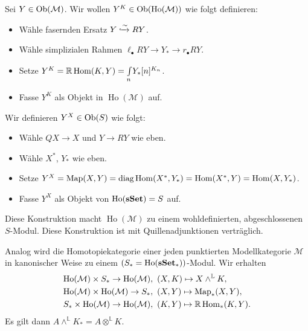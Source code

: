 \documentclass{cheat-sheet}
\newcommand{\ModC}{\mathcal{M}} %
\DeclareMathOperator{\Ho}{Ho} %
\newcommand{\LL}{\mathbb{L}} %
\newcommand{\RR}{\mathbb{R}} %
\newcommand{\RD}[1]{\mathbb{R} #1} %
\begin{document}
Sei $Y \in \Ob(\ModC)$.
Wir wollen $Y^K \in \Ob(\Ho(\ModC))$ wie folgt definieren:
\begin{itemize}
  \item Wähle fasernden Ersatz $Y \xhookrightarrow{{\sim}} RY$.
  \item Wähle simplizialen Rahmen $\ell_\bullet RY \to Y_* \to r_\bullet RY$.
  \item Setze $Y^K = \RD \Hom(K, Y) = \EndC{n} Y_*[n]^{K_n}$.
  \item Fasse $Y^K$ als Objekt in $\Ho(\ModC)$ auf.
\end{itemize}

Wir definieren $Y^X \in \operatorname{Ob}(S)$ wie folgt:
\begin{itemize}
  \item Wähle $QX \to X$ und $Y \to RY$ wie eben.
  \item Wähle $X^*$, $Y_*$ wie eben.
  \item Setze $Y^X = \text{Map}(X, Y) = \text{diag} \operatorname{Hom}(X^*, Y_*) = \operatorname{Hom}(X^*, Y) = \operatorname{Hom}(X, Y_*)$.
  \item Fasse $Y^X$ als Objekt von $\Ho(\sSet) = S$ auf.
\end{itemize}

\begin{satz}
  Diese Konstruktion macht $\Ho(\ModC)$ zu einem wohldefinierten, abgeschlossenen $S$-Modul.
  Diese Konstruktion ist mit Quillenadjunktionen verträglich. %
\end{satz}

\begin{satz}
  Analog wird die Homotopiekategorie einer jeden punktierten Modellkategorie $\ModC$ in kanonischer Weise zu einem $(S_* = \Ho(\sSet_*))$-Modul.
  Wir erhalten
  \begin{align*}
    \Ho(\ModC) \times S_* \to \Ho(\ModC), \enspace & (X, K) \mapsto X \wedge^{\LL} K, \\
    \Ho(\ModC) \times \Ho(\ModC) \to S_*, \enspace & (X, Y) \mapsto \text{Map}_*(X, Y), \\
    S_* \times \Ho(\ModC) \to \Ho(\ModC), \enspace & (K, Y) \mapsto \RR \Hom_*(K, Y).
  \end{align*}
  Es gilt dann $A \wedge^{\LL} K_* = A \otimes^{\LL} K$.
\end{satz}

\pagebreak

\end{document}
